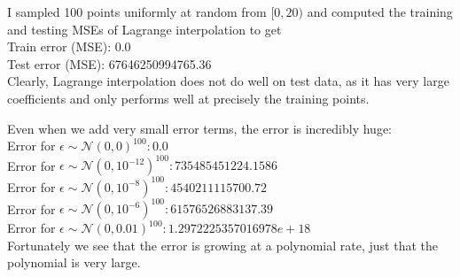 \documentclass[a4paper]{article}
\theoremstyle{definition}
\begin{document}
	I sampled 100 points uniformly at random from $ [0,20) $ and computed the training and testing MSEs of Lagrange interpolation to get\\
	Train error (MSE): 0.0\\
	Test error (MSE): 67646250994765.36\\
	Clearly, Lagrange interpolation does not do well on test data, as it has very large coefficients and only performs well at precisely the training points.
	
	Even when we add very small error terms, the error is incredibly huge:\\
	Error for $ \epsilon\sim \mathcal{N}(0,0)^{100}: 0.0 $\\
	Error for $ \epsilon\sim \mathcal{N}(0,10^{-12})^{100}: 735485451224.1586 $\\
	Error for $ \epsilon\sim \mathcal{N}(0,10^{-8})^{100}: 4540211115700.72 $\\
	Error for $ \epsilon\sim \mathcal{N}(0,10^{-6})^{100}: 61576526883137.39 $\\
	Error for $ \epsilon\sim \mathcal{N}(0,0.01)^{100}: 1.2972225357016978e+18 $\\
	Fortunately we see that the error is growing at a polynomial rate, just that the polynomial is very large.
	
	
	
	
	
\end{document}
